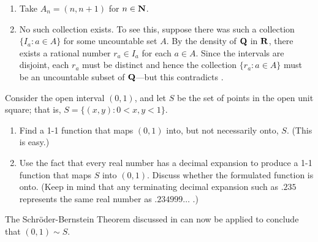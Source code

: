 \documentclass{lew98_solutions}
\begin{document}
\begin{solution}
    \begin{enumerate}
        \item Take \( A_n = (n, n+1) \) for \( n \in \mathbf{N} \).

        \item No such collection exists. To see this, suppose there was such a collection \( \{ I_a : a \in A \} \) for some uncountable set \( A \). By the density of \( \mathbf{Q} \) in \( \mathbf{R} \), there exists a rational number \( r_a \in I_a \) for each \( a \in A \). Since the intervals are disjoint, each \( r_a \) must be distinct and hence the collection \( \{ r_a : a \in A \} \) must be an uncountable subset of \( \mathbf{Q} \)---but this contradicts .
    \end{enumerate}
\end{solution}

\begin{exercise}
\label{ex:1.5.7}
    Consider the open interval \( (0, 1) \), and let \( S \) be the set of points in the open unit square; that is, \( S = \{ (x, y) : 0 < x, y < 1 \} \).
    \begin{enumerate}
        \item Find a 1-1 function that maps \( (0, 1) \) into, but not necessarily onto, \( S \). (This is easy.)

        \item Use the fact that every real number has a decimal expansion to produce a 1-1 function that maps \( S \) into \( (0, 1) \). Discuss whether the formulated function is onto. (Keep in mind that any terminating decimal expansion such as \( .235 \) represents the same real number as \( .234999 \ldots \) .)
    \end{enumerate}
    The Schröder-Bernstein Theorem discussed in  can now be applied to conclude that \( (0, 1) \sim S \).
\end{exercise}
\end{document}
